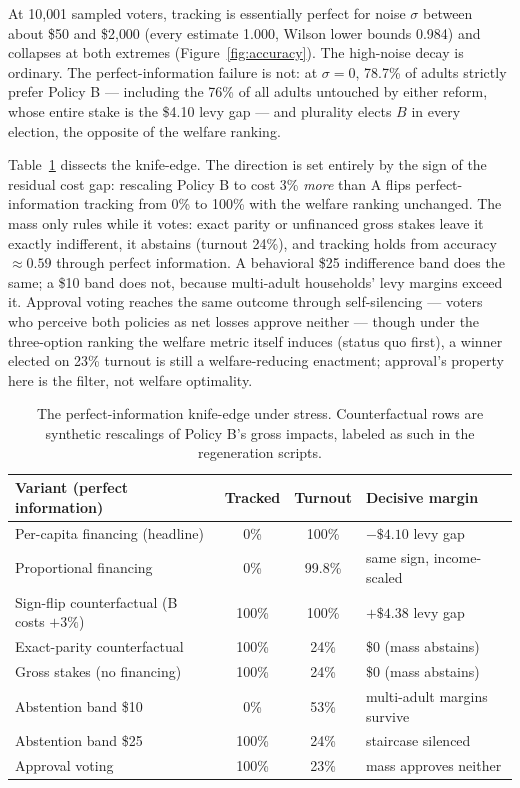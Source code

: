 \documentclass[11pt]{article}
\begin{document}
At 10{,}001 sampled voters, tracking is essentially perfect for noise
\(\sigma\) between about \$50 and \$2{,}000 (every estimate 1.000, Wilson
lower bounds 0.984) and collapses at both extremes
(Figure~\ref{fig:accuracy}). The high-noise decay is ordinary. The
perfect-information failure is not: at \(\sigma = 0\), 78.7\% of adults
strictly prefer Policy B --- including the 76\% of all adults untouched
by either reform, whose entire stake is the \$4.10 levy gap --- and
plurality elects \(B\) in every election, the opposite of the
welfare ranking.

Table~\ref{tab:knife} dissects the knife-edge. The direction is set
entirely by the sign of the residual cost gap: rescaling Policy B to cost
3\% \emph{more} than A flips perfect-information tracking from 0\% to
100\% with the welfare ranking unchanged. The mass only rules while it
votes: exact parity or unfinanced gross stakes leave it exactly
indifferent, it abstains (turnout 24\%), and tracking holds from accuracy
\(\approx 0.59\) through perfect information. A behavioral \$25
indifference band does the same; a \$10 band does not, because multi-adult
households' levy margins exceed it. Approval voting reaches the same
outcome through self-silencing --- voters who perceive both policies as
net losses approve neither --- though under the three-option ranking the
welfare metric itself induces (status quo first), a winner elected on
23\% turnout is still a welfare-reducing enactment; approval's property here is the
filter, not welfare optimality.

\begin{table}[t]
\centering
\small
\begin{tabular}{lccl}
\toprule
Variant (perfect information) & Tracked & Turnout & Decisive margin \\
\midrule
Per-capita financing (headline) & 0\% & 100\% & \(-\$4.10\) levy gap \\
Proportional financing & 0\% & 99.8\% & same sign, income-scaled \\
Sign-flip counterfactual (B costs $+3\%$) & 100\% & 100\% & \(+\$4.38\) levy gap \\
Exact-parity counterfactual & 100\% & 24\% & \$0 (mass abstains) \\
Gross stakes (no financing) & 100\% & 24\% & \$0 (mass abstains) \\
Abstention band \$10 & 0\% & 53\% & multi-adult margins survive \\
Abstention band \$25 & 100\% & 24\% & staircase silenced \\
Approval voting & 100\% & 23\% & mass approves neither \\
\bottomrule
\end{tabular}
\caption{The perfect-information knife-edge under stress. Counterfactual
rows are synthetic rescalings of Policy B's gross impacts, labeled as such
in the regeneration scripts.}
\label{tab:knife}
\end{table}
\end{document}
